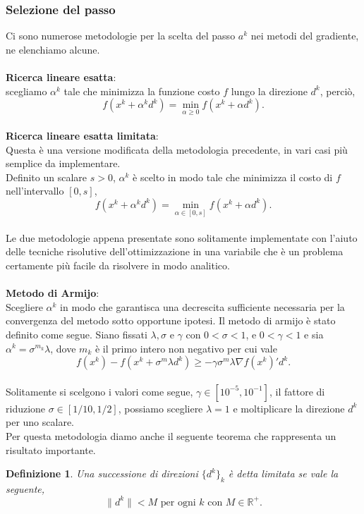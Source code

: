 \documentclass[a4paper, 12pt]{article}
\newtheorem{definition}{Definizione}
\begin{document}
\subsubsection{Selezione del passo} \label{stepsel}
Ci sono numerose metodologie per la scelta del passo $a^k$ nei metodi del gradiente, ne elenchiamo alcune.\\\\
\textbf{Ricerca lineare esatta}:\\
scegliamo $\alpha^k$ tale che minimizza la funzione costo $f$ lungo la direzione $d^k$, perciò,\\
\[f(x^k + \alpha^k d^k) = \min_{\alpha \geq 0} f(x^k + \alpha d^k).\]\\
\textbf{Ricerca lineare esatta limitata}:\\
Questa è una versione modificata della metodologia precedente, in vari casi più semplice da implementare.\\
Definito un scalare $s > 0$, $\alpha^k$ è scelto in modo tale che minimizza il costo di $f$ nell'intervallo $[0, s]$,\\
\[f(x^k + \alpha^k d^k) = \min_{\alpha \in [0, s]} f(x^k + \alpha d^k).\]\\
Le due metodologie appena presentate sono solitamente implementate con l'aiuto delle tecniche risolutive dell'ottimizzazione in una variabile che è un problema certamente più facile da risolvere in modo analitico.\\\\
\textbf{Metodo di Armijo}:\\
Scegliere $\alpha^k$ in modo che garantisca una decrescita sufficiente necessaria per la convergenza del metodo sotto opportune ipotesi. Il metodo di armijo è stato definito come segue. Siano fissati $\lambda, \sigma$ e $\gamma$ con $0 < \sigma < 1$, e $0 < \gamma < 1$ e sia $\alpha^k = \sigma^{m_k} \lambda$, dove $m_k$ è il primo intero non negativo per cui vale\\
\[f(x^k) - f(x^k + \sigma^m \lambda d^k) \geq -\gamma \sigma^m \lambda \nabla f(x^k)'d^k.\]\\
Solitamente si scelgono i valori come segue, $\gamma \in [10^{-5}, 10^{-1}]$, il fattore di riduzione $\sigma \in [1/10, 1/2]$, possiamo scegliere $\lambda = 1$ e moltiplicare la direzione $d^k$ per uno scalare.\\
Per questa metodologia diamo anche il seguente teorema che rappresenta un risultato importante.
\begin{definition}
Una successione di direzioni $\{d^k\}_k$ è detta limitata se vale la seguente,\\ \[\parallel d^k \parallel < M \mbox{ per ogni } k \mbox{ con } M \in \mathbb{R}^+.\]
\end{definition}
\end{document}

